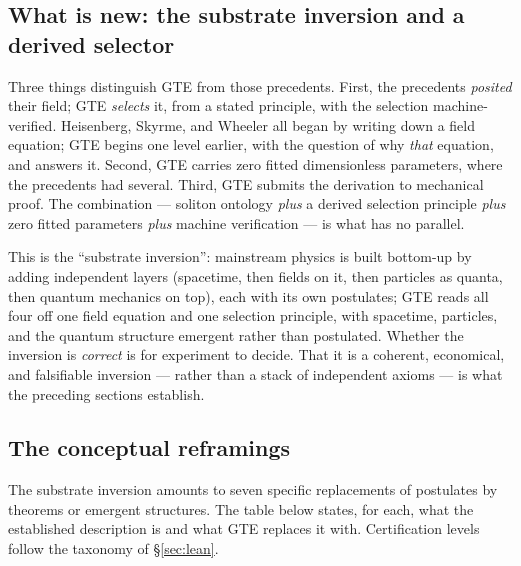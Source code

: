 \documentclass[11pt]{article}
\begin{document}
\subsection{What is new: the substrate inversion and a derived selector}

Three things distinguish GTE from those precedents.  First, the precedents
\emph{posited} their field; GTE \emph{selects} it, from a stated principle, with the
selection machine-verified.  Heisenberg, Skyrme, and Wheeler all began by writing
down a field equation; GTE begins one level earlier, with the question of why
\emph{that} equation, and answers it.  Second, GTE carries zero fitted dimensionless
parameters, where the precedents had several.  Third, GTE submits the derivation to
mechanical proof.  The combination --- soliton ontology \emph{plus} a derived
selection principle \emph{plus} zero fitted parameters \emph{plus} machine
verification --- is what has no parallel.

This is the ``substrate inversion'': mainstream physics is built bottom-up by adding
independent layers (spacetime, then fields on it, then particles as quanta, then
quantum mechanics on top), each with its own postulates; GTE reads all four off one
field equation and one selection principle, with spacetime, particles, and the
quantum structure emergent rather than postulated.  Whether the inversion is
\emph{correct} is for experiment to decide.  That it is a coherent, economical, and
falsifiable inversion --- rather than a stack of independent axioms --- is what the
preceding sections establish.

\subsection{The conceptual reframings}

The substrate inversion amounts to seven specific replacements of postulates by
theorems or emergent structures.  The table below states, for each, what the
established description is and what GTE replaces it with.  Certification levels
follow the taxonomy of §\ref{sec:lean}.
\end{document}

